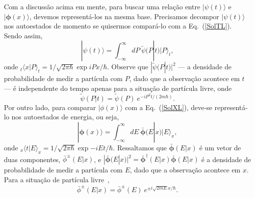 Com a discussão acima em mente, para buscar uma relação entre $|\psi(t)\rangle$ e $|\pmb{\phi}(x)\rangle$, devemos representá-los na mesma base. Precisamos decompor $|\psi(t)\rangle$ nos autoestados de momento se quisermos compará-lo com a Eq.~(\ref{SolTL}). Sendo assim,
\begin{equation}\label{SolXP}
|\psi(t)\rangle=\int_{-\infty}^{\infty} dP ~ {\tilde \psi}(P|t) |P\rangle_t,
\end{equation}
onde ${_t\langle} x|P\rangle_t=1/\sqrt{2\pi \hbar}\exp{iPx/\hbar}$. Observe que
$|{\tilde \psi}(P|t)|^2$ --- a densidade de probabilidade de medir a partícula com $P$, dado que a observação acontece em $t$ --- é independente do tempo apenas para a situação de partícula livre, onde
\begin{equation}\label{SolXP2}
{\tilde \psi}(P|t)={\tilde \psi}(P)~e^{-i P^2t/(2m\hbar)}.
\end{equation}
Por outro lado, para comparar $|\phi(x)\rangle$ com a Eq.~(\ref{SolXL}), deve-se representá-lo nos autoestados de energia, ou seja,
\begin{equation}\label{SolTE}
|{\pmb \phi}(x)\rangle=\int_{-\infty}^{\infty} dE ~ {\bar {\pmb\phi}}(E|x) |E\rangle_x,
\end{equation}
onde ${_x\langle} t|E\rangle_x=1/\sqrt{2\pi \hbar} \exp{-iEt/\hbar}$. Ressaltamos que ${\bar{\pmb{\phi}}}(E|x)$ é um vetor de duas componentes, ${\bar{{\phi}}}^\pm(E|x)$, e $|{\bar{\pmb{\phi}}} (E|x)|^2={\bar{\pmb{\phi}}}^\dagger(E|x) {\bar{\pmb{\phi}}}(E|x)$ é a densidade de probabilidade de medir a partícula com $E$, dado que a observação acontece em $x$. Para a situação de partícula livre~\cite{Dias},
\begin{equation}\label{SolTE2}
{\bar \phi}^{\pm}(E|x)={\bar \phi}^{\pm}(E)~e^{\pm i \sqrt{2mE} x/\hbar}.
\end{equation}






